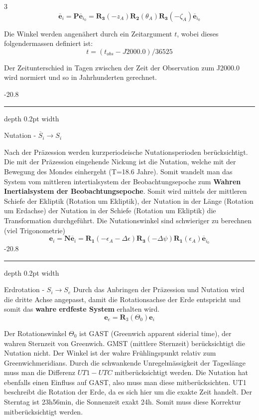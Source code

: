\documentclass[9pt, landscape, fleqn]{scrartcl}
\makeatletter
\renewcommand{\subsubsection}{\@startsection{subsubsection}{1}{0mm}%
{-2\baselineskip}{0.8\baselineskip}%
{\hrule depth 0.2pt width\columnwidth\vspace*{1.2em}\normalsize\bfseries\rmfamily}}
\makeatother
\begin{document}
\begin{multicols*}{3}
\begin{equation*}
    \mathbf{\overline{e}}_i = \mathbf{P} \mathbf{\overline{e}}_{i_0} = \mathbf{R_3}(-z_A)\mathbf{R_2}(\theta_A) \mathbf{R_3}(-\zeta_A) \mathbf{\overline{e}}_{i_0}
\end{equation*}

Die Winkel werden angenähert durch ein Zeitargument $t$, wobei dieses folgendermassen definiert ist:
\begin{equation*}
    t = (t_{obs}-J2000.0) / 36525
\end{equation*}

Der Zeitunterschied in Tagen zwischen der Zeit der Observation zum J2000.0 wird normiert und so in Jahrhunderten gerechnet.

\subsubsection{Nutation - $\overline{S}_{i} \rightarrow S_i$}

Nach der Präzession werden kurzperiodeische Nutationsperioden berücksichtigt. Die mit der Präzession eingehende Nickung ist die Nutation, welche mit der Bewegung des Mondes einhergeht (T=18.6 Jahre). Somit wandelt man das System vom mittleren intertialsystem der Beobachtungsepoche zum \textbf{Wahren Inertialsystem der Beobachtungsepoche}.
Somit wird mittels der mittleren Schiefe der Ekliptik (Rotation um Ekliptik), der Nutation in der Länge (Rotation um Erdachse) der Nutation in der Schiefe (Rotation um Ekliptik) die Transformation durchgeführt. Die Nutationswinkel sind schwieriger zu berechnen (viel Trigonometrie)
\begin{equation*}
    \mathbf{e}_i = \mathbf{N} \mathbf{\overline{e}}_{i} = \mathbf{R_1}(-\epsilon_A-\Delta \epsilon)\mathbf{R_3}(-\Delta \psi) \mathbf{R_1}(\epsilon_A) \mathbf{\overline{e}}_{i_0}
\end{equation*}
\subsubsection{Erdrotation - $S_i \rightarrow S_e$}
Durch das Anbringen der Präzession und Nutation wird die dritte Achse angepasst, damit die Rotationsachse der Erde entspricht und somit das \textbf{wahre erdfeste System} erhalten wird.
\begin{equation*}
    \mathbf{e}_e = \mathbf{R}_3(\Theta_0) \mathbf{e}_{i} 
\end{equation*}

Der Rotationswinkel $\Theta_0$ ist GAST (Greenwich apparent siderial time), der wahren Sternzeit von Greenwich. GMST (mittlere Sternzeit) berücksichtigt die Nutation nicht. Der Winkel ist der wahre Frühlingspunkt relativ zum Greenwichmeridians. Durch die schwankende Unregelmässigkeit der Tageslänge muss man die Differenz $UT1-UTC$ mitberücksichtigt werden. Die Nutation hat ebenfalls einen Einfluss auf GAST, also muss man diese mitberücksichten. UT1 beschreibt die Rotation der Erde, da es sich hier um die exakte Zeit handelt. Der Sterntag ist 23h56min, die Sonnenzeit exakt 24h. Somit muss diese Korrektur mitberücksichtigt werden.


\end{multicols*}
\end{document}
